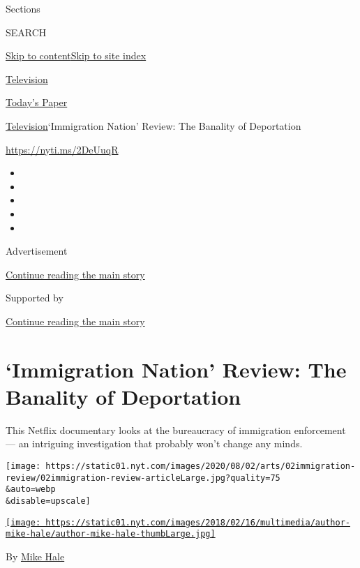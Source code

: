 Sections

SEARCH

\protect\hyperlink{site-content}{Skip to
content}\protect\hyperlink{site-index}{Skip to site index}

\href{https://www.nytimes.com/section/arts/television}{Television}

\href{https://myaccount.nytimes.com/auth/login?response_type=cookie\&client_id=vi}{}

\href{https://www.nytimes.com/section/todayspaper}{Today's Paper}

\href{/section/arts/television}{Television}\textbar{}`Immigration
Nation' Review: The Banality of Deportation

\url{https://nyti.ms/2DeUuqR}

\begin{itemize}
\item
\item
\item
\item
\item
\end{itemize}

Advertisement

\protect\hyperlink{after-top}{Continue reading the main story}

Supported by

\protect\hyperlink{after-sponsor}{Continue reading the main story}

\hypertarget{immigration-nation-review-the-banality-of-deportation}{%
\section{`Immigration Nation' Review: The Banality of
Deportation}\label{immigration-nation-review-the-banality-of-deportation}}

This Netflix documentary looks at the bureaucracy of immigration
enforcement --- an intriguing investigation that probably won't change
any minds.

\texttt{[image: https://static01.nyt.com/images/2020/08/02/arts/02immigration-review/02immigration-review-articleLarge.jpg?quality=75\\\&auto=webp\\\&disable=upscale]}

\href{https://www.nytimes.com/by/mike-hale}{\texttt{[image: https://static01.nyt.com/images/2018/02/16/multimedia/author-mike-hale/author-mike-hale-thumbLarge.jpg]}}

By \href{https://www.nytimes.com/by/mike-hale}{Mike Hale}

